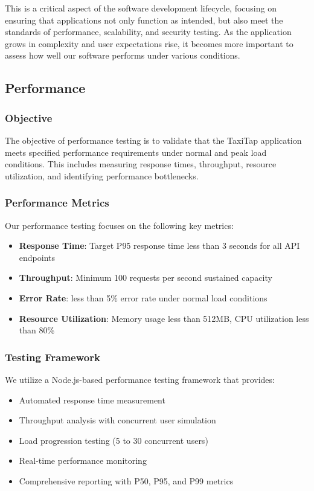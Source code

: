 \documentclass[a4paper,12pt]{article}
\begin{document}
This is a critical aspect of the software development lifecycle, focusing on ensuring that applications not only function as intended, but also meet the standards of performance, scalability, and security testing. As the application grows in complexity and user expectations rise, it becomes more important to assess how well our software performs under various conditions.

\subsection{Performance}

\subsubsection{Objective}
The objective of performance testing is to validate that the TaxiTap application meets specified performance requirements under normal and peak load conditions. This includes measuring response times, throughput, resource utilization, and identifying performance bottlenecks.

\subsubsection{Performance Metrics}
Our performance testing focuses on the following key metrics:
\begin{itemize}
    \item \textbf{Response Time}: Target P95 response time less than 3 seconds for all API endpoints
    \item \textbf{Throughput}: Minimum 100 requests per second sustained capacity
    \item \textbf{Error Rate}: less than 5\% error rate under normal load conditions
    \item \textbf{Resource Utilization}: Memory usage less than 512MB, CPU utilization less than 80\%
\end{itemize}

\subsubsection{Testing Framework}
We utilize a Node.js-based performance testing framework that provides:
\begin{itemize}
    \item Automated response time measurement
    \item Throughput analysis with concurrent user simulation
    \item Load progression testing (5 to 30 concurrent users)
    \item Real-time performance monitoring
    \item Comprehensive reporting with P50, P95, and P99 metrics
\end{itemize}
\end{document}

